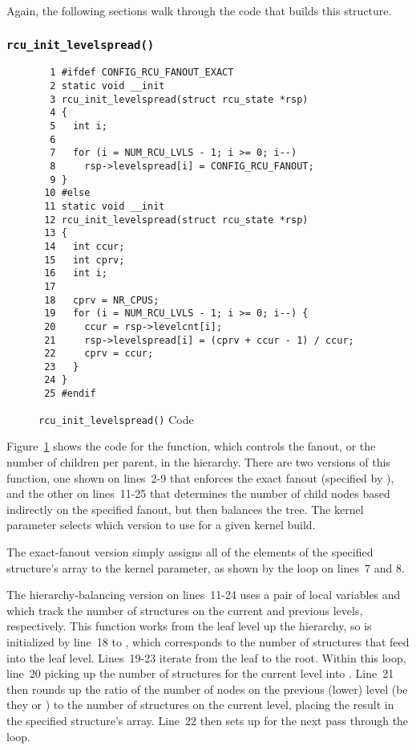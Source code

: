Again, the following sections walk through the code that builds this
structure.

\subsubsection{\tt rcu\_init\_levelspread()}
\label{app:rcuimpl:rcutreewt:rcu-init-levelspread}

\begin{figure}[tbp]
{ \scriptsize
\begin{verbatim}
  1 #ifdef CONFIG_RCU_FANOUT_EXACT
  2 static void __init
  3 rcu_init_levelspread(struct rcu_state *rsp)
  4 {
  5   int i;
  6
  7   for (i = NUM_RCU_LVLS - 1; i >= 0; i--)
  8     rsp->levelspread[i] = CONFIG_RCU_FANOUT;
  9 }
 10 #else
 11 static void __init
 12 rcu_init_levelspread(struct rcu_state *rsp)
 13 {
 14   int ccur;
 15   int cprv;
 16   int i;
 17
 18   cprv = NR_CPUS;
 19   for (i = NUM_RCU_LVLS - 1; i >= 0; i--) {
 20     ccur = rsp->levelcnt[i];
 21     rsp->levelspread[i] = (cprv + ccur - 1) / ccur;
 22     cprv = ccur;
 23   }
 24 }
 25 #endif
\end{verbatim}
}
\caption{{\tt rcu\_init\_levelspread()} Code}
\label{fig:app:rcuimpl:rcutreewt:Code for rcu-init-levelspread}
\end{figure}

Figure~\ref{fig:app:rcuimpl:rcutreewt:Code for rcu-init-levelspread}
shows the code for the  function, which controls
the fanout, or the number of children per parent,
in the  hierarchy.
There are two versions of this function, one shown on lines~2-9 that
enforces the exact fanout (specified by ),
and the other on lines~11-25 that determines the number of child nodes
based indirectly on the specified fanout, but then balances the tree.
The  kernel parameter selects which version
to use for a given kernel build.

The exact-fanout version simply assigns all of the elements of the
specified  structure's  array to
the  kernel parameter, as shown by the loop
on lines~7 and 8.

The hierarchy-balancing version on lines~11-24
uses a pair of local variables  and  which track
the number of  structures on the current and previous
levels, respectively.
This function works from the leaf level up the hierarchy, so 
is initialized by line~18 to , which corresponds
to the number of  structures that feed into the leaf level.
Lines~19-23 iterate from the leaf to the root.
Within this loop, line~20 picking up
the number of  structures for the current level into
.
Line~21 then rounds up the ratio of the number of nodes on the previous
(lower) level (be they  or )
to the number of  structures on the current
level, placing the result in the specified  structure's
 array.
Line~22 then sets up for the next pass through the loop.

